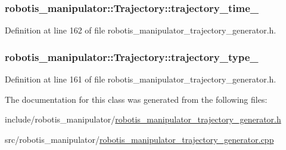 \subsubsection[{\texorpdfstring{trajectory\+\_\+time\+\_\+}{trajectory_time_}}]{ robotis\+\_\+manipulator\+::\+Trajectory\+::trajectory\+\_\+time\+\_\+\hspace{0.3cm}{\ttfamily [private]}}\hypertarget{classrobotis__manipulator_1_1_trajectory_ab6bc1ea3ef5611ddf84667040bf47ceb}{}\label{classrobotis__manipulator_1_1_trajectory_ab6bc1ea3ef5611ddf84667040bf47ceb}


Definition at line 162 of file robotis\+\_\+manipulator\+\_\+trajectory\+\_\+generator.\+h.

\subsubsection[{\texorpdfstring{trajectory\+\_\+type\+\_\+}{trajectory_type_}}]{ robotis\+\_\+manipulator\+::\+Trajectory\+::trajectory\+\_\+type\+\_\+\hspace{0.3cm}{\ttfamily [private]}}\hypertarget{classrobotis__manipulator_1_1_trajectory_ad21a6583cfce56cc25ea8469d77293ec}{}\label{classrobotis__manipulator_1_1_trajectory_ad21a6583cfce56cc25ea8469d77293ec}


Definition at line 161 of file robotis\+\_\+manipulator\+\_\+trajectory\+\_\+generator.\+h.



The documentation for this class was generated from the following files\+:\begin{DoxyCompactItemize}
\item 
include/robotis\+\_\+manipulator/\hyperlink{robotis__manipulator__trajectory__generator_8h}{robotis\+\_\+manipulator\+\_\+trajectory\+\_\+generator.\+h}\item 
src/robotis\+\_\+manipulator/\hyperlink{robotis__manipulator__trajectory__generator_8cpp}{robotis\+\_\+manipulator\+\_\+trajectory\+\_\+generator.\+cpp}\end{DoxyCompactItemize}
